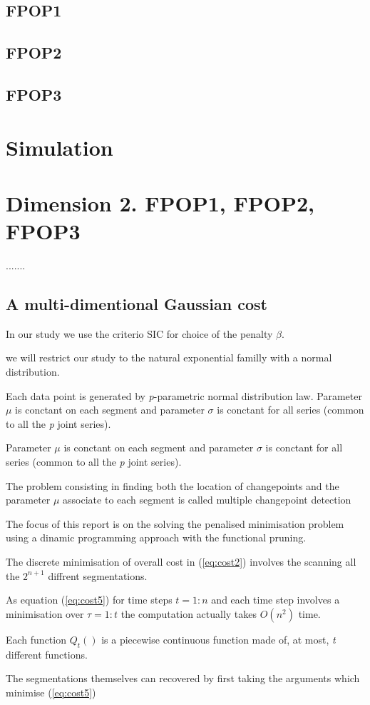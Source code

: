\documentclass[a4paper,12pt]{article}
\begin{document}
		\subsection{FPOP1}
		\label{FPOP1}
		\subsection{FPOP2}
		\label{FPOP2}
		\subsection{FPOP3}
		\label{FPOP3}	
		\section{Simulation}
		\section{Dimension 2. FPOP1, FPOP2, FPOP3}
		.......
		\subsection{A multi-dimentional Gaussian cost}
		\label{gaussian cost}
		
		In our study we use the criterio SIC for choice of the penalty $\beta$.
		
		we will restrict our study to the natural exponential familly with a normal distribution.
		
		
		Each data point is generated by \textit{p}-parametric normal distribution law. Parameter $\mu$ is conctant on each segment and parameter  $\sigma$ is conctant for all series (common to all the \textit{p} joint series).
		
		
		Parameter $\mu$ is conctant on each segment and parameter  $\sigma$ is conctant for all series (common to all the \textit{p} joint series).
		
		
		The problem consisting in finding both the location of changepoints and the parameter $\mu$ associate to each segment  is called multiple changepoint detection 
		
		The focus of this report is on the solving the penalised minimisation problem using a dinamic programming approach with the functional pruning.
		
		
			The discrete minimisation of overall cost in (\ref{eq:cost2}) involves the scanning all the $2^{n+1}$ diffrent segmentations.  
			
			As equation (\ref{eq:cost5}) for time steps $t = 1:n$ and each time step involves a minimisation over $\tau = 1:t$ the computation actually takes $O(n^2)$ time.
			
			Each function $Q_t()$ is a piecewise continuous function made of, at most, \textit{t} different functions.
			
				 	 
			
			
			
			
			
			
			The segmentations themselves can recovered by first taking the arguments which minimise (\ref{eq:cost5}) 
			
\end{document}
